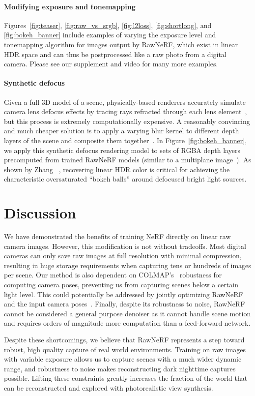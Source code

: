 \paragraph{Modifying exposure and tonemapping} Figures~\ref{fig:teaser}, \ref{fig:raw_vs_srgb},
\ref{fig:l2loss}, \ref{fig:shortlong}, and \ref{fig:bokeh_banner} include examples of varying the exposure level and tonemapping algorithm for images output by RawNeRF, which exist in linear HDR space and can thus be postprocessed like a raw photo from a digital camera. 
Please see our supplement and video for many more examples.


\paragraph{Synthetic defocus} 
Given a full 3D model of a scene, physically-based renderers accurately simulate camera lens defocus effects by tracing rays refracted through each lens element~\cite{lenstracing}, but this process is extremely computationally expensive. 
A reasonably convincing and much cheaper solution is to apply a varying blur kernel to different depth layers of the scene and composite them together~\cite{barron2015stereo,wadhwa2018defocus}. In Figure~\ref{fig:bokeh_banner}, we apply this synthetic defocus rendering model to sets of RGBA depth layers precomputed from trained RawNeRF models (similar to a multiplane image~\cite{zhou18stereomag}). 
As shown by Zhang \etal~\cite{zhang2019defocus}, recovering linear HDR color is critical for achieving the characteristic oversaturated ``bokeh balls'' around defocused bright light sources. 




\section{Discussion}

We have demonstrated the benefits of training NeRF directly on linear raw camera images. However, this modification is not without tradeoffs. Most digital cameras can only save raw images at full resolution with minimal compression, 
resulting in huge storage requirements when capturing tens or hundreds of images per scene.
Our method is also dependent on COLMAP's~\cite{colmap} robustness for computing camera poses, preventing us from capturing scenes below a certain light level. This could potentially be addressed by jointly optimizing RawNeRF and the input camera poses~\cite{wang2021nerfmm,lin2021barf}. Finally, despite its robustness to noise, RawNeRF cannot be considered a general purpose denoiser as it cannot handle scene motion and requires orders of magnitude more computation than a feed-forward network. 

Despite these shortcomings, we believe that RawNeRF represents a step toward robust, high quality capture of real world environments. Training on raw images with variable exposure allows us to capture scenes with a much wider dynamic range, and robustness to noise makes reconstructing dark nighttime captures possible. Lifting these constraints greatly increases the fraction of the world that can be reconstructed and explored with photorealistic view synthesis.




